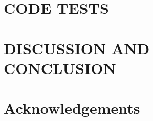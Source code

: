 \documentclass[fleqn,usenatbib]{mnras}
\begin{document}
%
%
\section{CODE TESTS}\label{sec:tests}

\section{DISCUSSION AND CONCLUSION}\label{sec:dandc}

\section*{Acknowledgements}








\appendix


\bsp
\label{lastpage}
\end{document}
